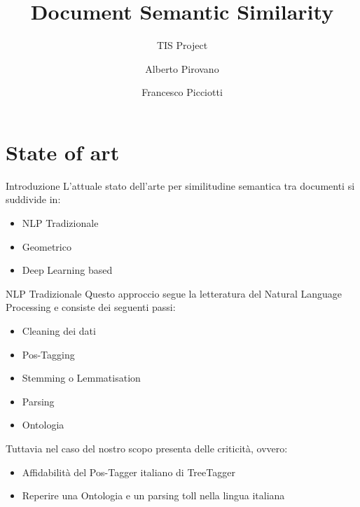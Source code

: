\documentclass[british]{beamer}
\begin{document}
%
\title[TIS Project]
{Document Semantic Similarity}

\subtitle{TIS Project}

\author[A. Pirovano, F. Picciotti]
{Alberto Pirovano \and Francesco Picciotti}




\maketitle

\section{State of art}

	\begin{frame}{Introduzione}
		L'attuale stato dell'arte per similitudine semantica tra documenti si suddivide in:
		\begin{itemize}
			\item NLP Tradizionale \pause 
			\item Geometrico \pause
			\item Deep Learning based \pause 
		\end{itemize}
	\end{frame}
	
	\begin{frame}{NLP Tradizionale}
		Questo approccio segue la letteratura del Natural Language Processing e consiste dei seguenti passi:
		\begin{itemize}
			\item Cleaning dei dati
			\item Pos-Tagging
			\item Stemming o Lemmatisation
			\item Parsing
			\item Ontologia
		\end{itemize}
		Tuttavia nel caso del nostro scopo presenta delle criticit\`{a}, ovvero:
		\begin{itemize}
			\item Affidabilit\`{a} del Pos-Tagger italiano di TreeTagger
			\item Reperire una Ontologia e un parsing toll nella lingua italiana
		\end{itemize}\pause
	\end{frame}
	
\end{document}
